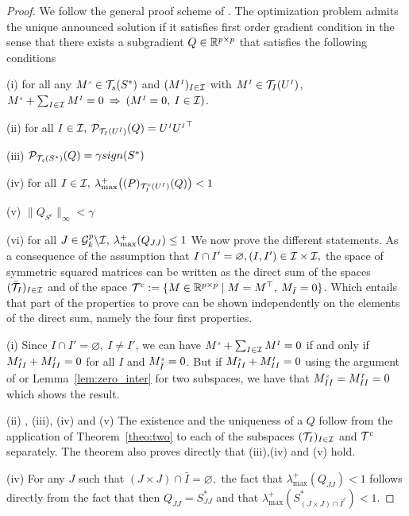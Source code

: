 \documentclass[letterpaper]{article}
\begin{document}
\begin{proof}
We follow the general proof scheme of \citet{chandrasekaran2011rank}. The optimization problem admits the unique announced solution if it satisfies first order gradient condition in the sense that there exists a subgradient $Q \in \mathbb{R}^{p \times p}$ that satisfies the following conditions
\BET
\item[(i)] for all any $M^{\scriptscriptstyle s} \in \mathcal{T}_s(S^*)$ and $(M^{{\scriptscriptstyle I}})_{I \in \mathcal{I}}$ with $M^{{\scriptscriptstyle I}} \in \mathcal{T}_I(U^{{\scriptscriptstyle I}})$, $M^{\scriptscriptstyle s}+\sum_{I \in \mathcal{I}} M^{{\scriptscriptstyle I}}=0 \: \Rightarrow \: (M^{{\scriptscriptstyle I}}=0, \:I \in \mathcal{I})$.
\item[(ii)] for all $I \in \mathcal{I},\:\mathcal{P}_{\mathcal{T}_I(U^{{\scriptscriptstyle I}})}(Q)=U^{{\scriptscriptstyle I}}{U^{{\scriptscriptstyle I}}}^\top$
\item[(iii)] $\mathcal{P}_{\mathcal{T}_s(S^*)}(Q)=\gamma sign(S^*)$
\item[(iv)] for all $I \in \mathcal{I},\:\lambda_{\max}^+\big (\mathcal(P)_{\mathcal{T}_I^c(U^{{\scriptscriptstyle I}})}(Q) \big )<1$
\item[(v)] $\|Q_{S^c}\|_{\infty}<\gamma$
\item[(vi)] for all $J \in \mathcal{G}^p_k \backslash \mathcal{I}, \: \lambda_{\max}^+(Q_{JJ})\leq 1$
\EET
We now prove the different statements. As a consequence of the assumption that $I \cap I'=\varnothing, (I,I') \in \mathcal{I} \times \mathcal{I},$ the space of symmetric squared matrices can be written as the direct sum of the spaces $(\bar{\mathcal{T}}_I)_{I \in \mathcal{I}}$ and of the space $\mathcal{T}^c:=\{M \in \mathbb{R}^{p \times p} \mid  M=M^\top, \: M_{\bar{I}}=0\}$. Which entails that part of the properties to prove can be shown independently on the elements of the direct sum, namely the four first properties. 
\BET
\item[(i)] Since $I \cap I'=\varnothing,\: I\neq I'$, we can have $M^{\scriptscriptstyle s}+\sum_{I \in \mathcal{I}} M^{{\scriptscriptstyle I}}=0$ if and only if $M^{\scriptscriptstyle s}_{II}+ M^{{\scriptscriptstyle I}}_{II}=0$ for all $I$ and $M^{\scriptscriptstyle s}_{\bar{I}}=0$. But if $M^{\scriptscriptstyle s}_{II}+ M^{{\scriptscriptstyle I}}_{II}=0$ using the argument of \citet{chandrasekaran2011rank} or Lemma~\ref{lem:zero_inter} for two subspaces, we have that $M^{\scriptscriptstyle s}_{II}= M^{{\scriptscriptstyle I}}_{II}=0$ which shows the result.
\item[(ii)], (iii), (iv) and (v) The existence and the uniqueness of a $Q$ follow from the application of Theorem~\ref{theo:two} to each of the subspaces $(\mathcal{T}_I)_{I \in\mathcal{I}}$ and $\mathcal{T}^c$ separately. The theorem also proves directly that (iii),(iv) and (v) hold.
\item[(iv)] For any $J$ such that $(J \times J) \cap \bar{I}=\varnothing,$ the fact that $\lambda_{\max}^+(Q_{JJ})<1$ follows directly from the fact that then $Q_{JJ}=S^*_{JJ}$ and that $\lambda_{\max}^+(S^*_{(J \times J) \cap \bar{I}^c})<1$.

\end{proof}
\end{document}
